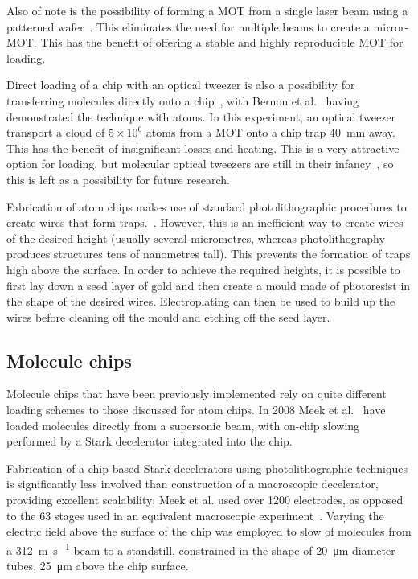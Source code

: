 Also of note is the possibility of forming a MOT from a single laser beam using
a patterned wafer~\cite{Nshii2013}. This eliminates the need for multiple beams
to create a mirror-MOT. This has the benefit of offering a stable and highly
reproducible MOT for loading.

Direct loading of a chip with an optical tweezer is also a possibility for
transferring molecules directly onto a chip~\cite{Liueaar7797}, with Bernon et
al.~\cite{Bernon2013} having demonstrated the technique with atoms. In this
experiment, an optical tweezer transport a cloud of $5\times10^6$ \esRb{}
atoms from a MOT onto a chip trap \SI{40}{\milli\metre} away. This has the
benefit of insignificant losses and heating. This is a very attractive option
for loading, but molecular optical tweezers are still in their
infancy~\cite{Anderegg2019}, so this is left as a possibility for future
research.

%
Fabrication of atom chips makes use of standard photolithographic procedures to
create wires that form traps.~\cite{2011Ac}. However, this is an inefficient way
to create wires of the desired height (usually several micrometres, whereas
photolithography produces structures tens of nanometres tall). This prevents the
formation of traps high above the surface. In order to achieve the required
heights, it is possible to first lay down a seed layer of gold and then create a
mould made of photoresist in the shape of the desired wires. Electroplating can
then be used to build up the wires before cleaning off the mould and etching off
the seed layer.~\cite{4797887}

\subsection{Molecule chips}
\label{litrev:molculechips}


Molecule chips that have been previously implemented rely on quite different
loading schemes to those discussed for atom chips. In 2008 Meek et
al.~\cite{Meek2008} have loaded \CO{} molecules directly from a supersonic
beam, with on-chip slowing performed by a Stark decelerator integrated into the
chip.

Fabrication of a chip-based Stark decelerators using photolithographic
techniques is significantly less involved than construction of a macroscopic
decelerator, providing excellent scalability; Meek et al. used over 1200
electrodes, as opposed to the 63 stages used in an equivalent macroscopic
experiment~\cite{Bethlem1999}. Varying the electric field above the surface of
the chip was employed to slow of molecules from a \SI{312}{\metre\per\second}
beam to a standstill, constrained in the shape of \SI{20}{\micro\metre} diameter
tubes, \SI{25}{\micro\metre} above the chip surface.~\cite{Meek2009}

